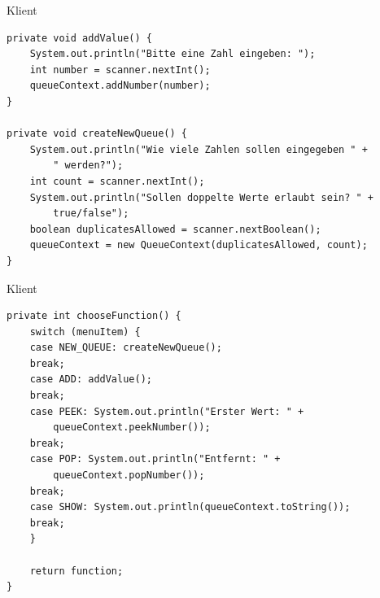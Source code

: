 \begin{frame}[fragile]{Klient}
	\begin{exampleblock}{}
        \begin{lstlisting}
private void addValue() {
    System.out.println("Bitte eine Zahl eingeben: ");
    int number = scanner.nextInt();
    queueContext.addNumber(number);
}

private void createNewQueue() {
    System.out.println("Wie viele Zahlen sollen eingegeben " +
        " werden?");
    int count = scanner.nextInt();
    System.out.println("Sollen doppelte Werte erlaubt sein? " + 
        true/false");
    boolean duplicatesAllowed = scanner.nextBoolean();
    queueContext = new QueueContext(duplicatesAllowed, count);
}
        \end{lstlisting}
 	\end{exampleblock}
\end{frame}

\begin{frame}[fragile]{Klient}
	\begin{exampleblock}{}
        \begin{lstlisting}
private int chooseFunction() {
    switch (menuItem) {
    case NEW_QUEUE: createNewQueue();
    break;
    case ADD: addValue();
    break;
    case PEEK: System.out.println("Erster Wert: " + 
        queueContext.peekNumber());
    break;
    case POP: System.out.println("Entfernt: " +     
        queueContext.popNumber());
    break;
    case SHOW: System.out.println(queueContext.toString());
    break;
    }
    
    return function;
}
        \end{lstlisting}
 	\end{exampleblock}
\end{frame}